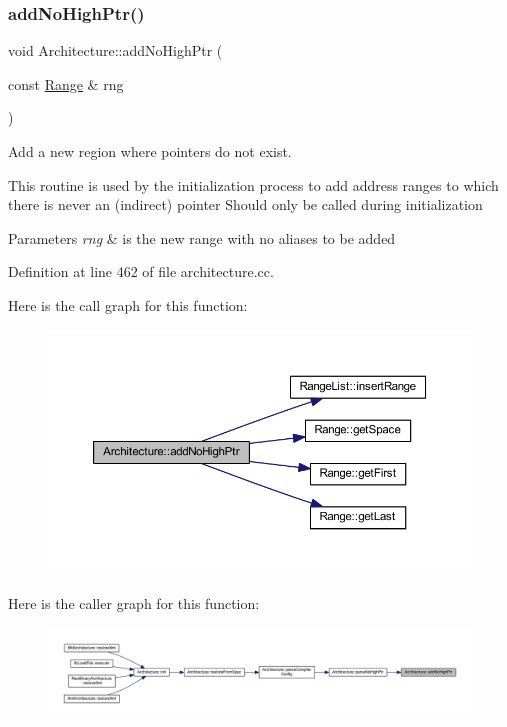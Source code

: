 \subsubsection{\texorpdfstring{addNoHighPtr()}{addNoHighPtr()}}
{\footnotesize\ttfamily void Architecture\+::add\+No\+High\+Ptr (\begin{DoxyParamCaption}\item[{const \mbox{\hyperlink{class_range}{Range}} \&}]{rng }\end{DoxyParamCaption})\hspace{0.3cm}{\ttfamily [protected]}}



Add a new region where pointers do not exist. 

This routine is used by the initialization process to add address ranges to which there is never an (indirect) pointer Should only be called during initialization 
\begin{DoxyParams}{Parameters}
{\em rng} & is the new range with no aliases to be added \\
\hline
\end{DoxyParams}


Definition at line 462 of file architecture.\+cc.

Here is the call graph for this function\+:
\nopagebreak
\begin{figure}[H]
\begin{center}
\leavevmode
\includegraphics[width=350pt]{class_architecture_a70efc8f5d9e212d039dccbfe8556f05d_cgraph}
\end{center}
\end{figure}
Here is the caller graph for this function\+:
\nopagebreak
\begin{figure}[H]
\begin{center}
\leavevmode
\includegraphics[width=350pt]{class_architecture_a70efc8f5d9e212d039dccbfe8556f05d_icgraph}
\end{center}
\end{figure}
\mbox{\label{class_architecture_a3bbc62dedbb13b6fdb2969e1e83446d5}} 
